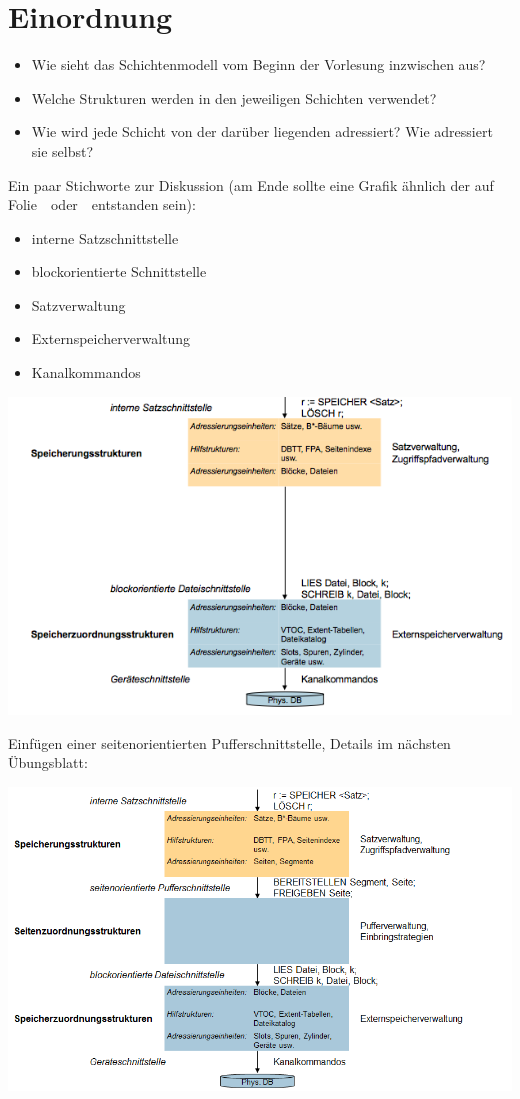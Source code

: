 \section{Einordnung}
\begin{itemize}
	\item Wie sieht das Schichtenmodell vom Beginn der Vorlesung inzwischen aus?
	\item Welche Strukturen werden in den jeweiligen Schichten verwendet?
	\item Wie wird jede Schicht von der darüber liegenden adressiert? Wie adressiert sie selbst?
\end{itemize}

\begin{solution}
Ein paar Stichworte zur Diskussion (am Ende sollte eine Grafik ähnlich der auf Folie~\SchichtVLFuenf~oder~\SchichtVLSechs~entstanden sein):
\begin{itemize}
	\item interne Satzschnittstelle
	\item blockorientierte Schnittstelle
	\item Satzverwaltung
	\item Externspeicherverwaltung
	\item Kanalkommandos
\end{itemize}

\includegraphics[width=14cm]{Pictures/Ue06_Aufgabe3_1.png}

Einfügen einer seitenorientierten Pufferschnittstelle, Details im nächsten Übungsblatt:

\includegraphics[width=14cm]{Pictures/Ue06_Aufgabe3_2.png}

\end{solution}
